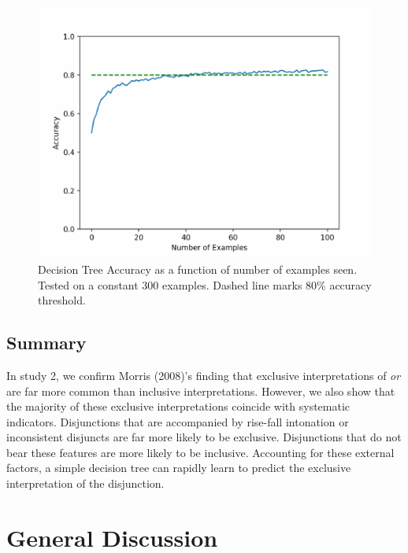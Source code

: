 \documentclass[10pt, letterpaper]{article}
\newenvironment{CodeChunk}{}{}
\begin{document}
\begin{CodeChunk}
\begin{figure}[tb]

{\centering \includegraphics{figs/learningCurve-1} 

}

\caption[Decision Tree Accuracy as a function of number of examples seen]{Decision Tree Accuracy as a function of number of examples seen. Tested on a constant 300 examples. Dashed line marks 80\% accuracy threshold.}\label{fig:learningCurve}
\end{figure}
\end{CodeChunk}

\subsection{Summary}\label{summary}

In study 2, we confirm Morris (2008)'s finding that exclusive
interpretations of \emph{or} are far more common than inclusive
interpretations. However, we also show that the majority of these
exclusive interpretations coincide with systematic indicators.
Disjunctions that are accompanied by rise-fall intonation or
inconsistent disjuncts are far more likely to be exclusive. Disjunctions
that do not bear these features are more likely to be inclusive.
Accounting for these external factors, a simple decision tree can
rapidly learn to predict the exclusive interpretation of the
disjunction.

\section{General Discussion}\label{general-discussion}
\end{document}
